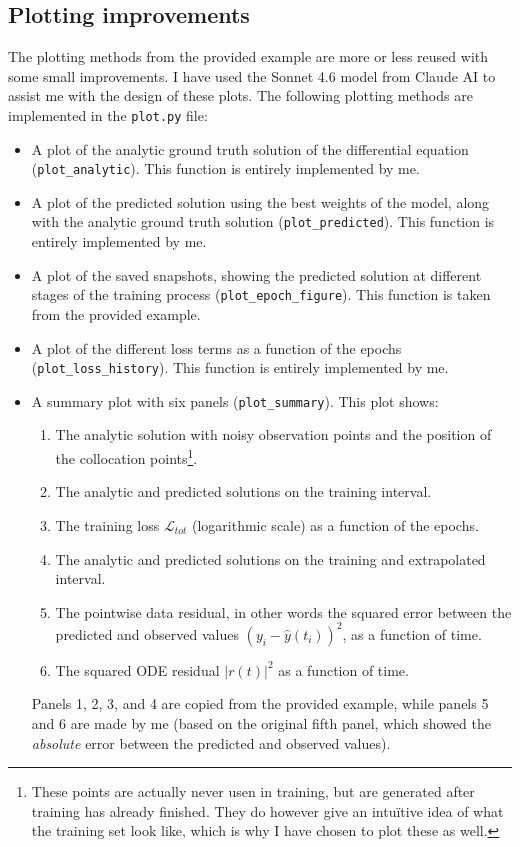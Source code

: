 \documentclass[we,twoside,openright,a4paper,11pt]{uantwerpenbamathesis}
\begin{document}
\subsection{Plotting improvements}
The plotting methods from the provided example are more or less reused with some small improvements. I have used the Sonnet 4.6 model from Claude AI to assist me with the design of these plots. The following plotting methods are implemented in the \verb|plot.py| file:
\begin{itemize}
    \item A plot of the analytic ground truth solution of the differential equation (\verb|plot_analytic|). This function is entirely implemented by me.
    \item A plot of the predicted solution using the best weights of the model, along with the analytic ground truth solution (\verb|plot_predicted|). This function is entirely implemented by me.
    \item A plot of the saved snapshots, showing the predicted solution at different stages of the training process (\verb|plot_epoch_figure|). This function is taken from the provided example.
    \item A plot of the different loss terms as a function of the epochs (\verb|plot_loss_history|). This function is entirely implemented by me.
    \item A summary plot with six panels (\verb|plot_summary|). This plot shows:
    \begin{enumerate}
        \item The analytic solution with noisy observation points and the position of the collocation points\footnote{These points are actually never usen in training, but are generated after training has already finished. They do however give an intuïtive idea of what the training set look like, which is why I have chosen to plot these as well.}.
        \item The analytic and predicted solutions on the training interval.
        \item The training loss $\mathcal{L}_{tot}$ (logarithmic scale) as a function of the epochs.
        \item The analytic and predicted solutions on the training and extrapolated interval. 
        \item The pointwise data residual, in other words the squared error between the predicted and observed values $(y_i-\hat{y}(t_i))^2$, as a function of time.
        \item The squared ODE residual $|r(t)|^2$ as a function of time.
    \end{enumerate}
    Panels 1, 2, 3, and 4 are copied from the provided example, while panels 5 and 6 are made by me (based on the original fifth panel, which showed the \textit{absolute} error between the predicted and observed values).
\end{itemize}
\end{document}
